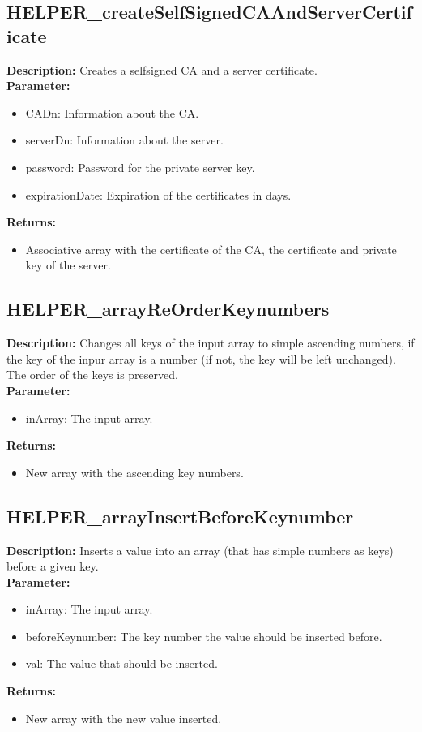 \subsection{HELPER\_createSelfSignedCAAndServerCertificate}
\textbf{Description:} Creates a selfsigned CA and a server certificate.\\
\textbf{Parameter:}
\begin{itemize}
\item CADn: Information about the CA.
\item serverDn: Information about the server.
\item password: Password for the private server key.
\item expirationDate: Expiration of the certificates in days.
\end{itemize}
\textbf{Returns:}
\begin{itemize}
\item Associative array with the certificate of the CA, the certificate and private key of the server.
\end{itemize}

\subsection{HELPER\_arrayReOrderKeynumbers}
\textbf{Description:} Changes all keys of the input array to simple ascending numbers, if the key of the inpur array is a number (if not, the key will be left unchanged). The order of the keys is preserved.\\
\textbf{Parameter:}
\begin{itemize}
\item inArray: The input array.
\end{itemize}
\textbf{Returns:}
\begin{itemize}
\item New array with the ascending key numbers.
\end{itemize}

\subsection{HELPER\_arrayInsertBeforeKeynumber}
\textbf{Description:} Inserts a value into an array (that has simple numbers as keys) before a given key.\\
\textbf{Parameter:}
\begin{itemize}
\item inArray: The input array.
\item beforeKeynumber: The key number the value should be inserted before.
\item val: The value that should be inserted.
\end{itemize}
\textbf{Returns:}
\begin{itemize}
\item New array with the new value inserted.
\end{itemize}

